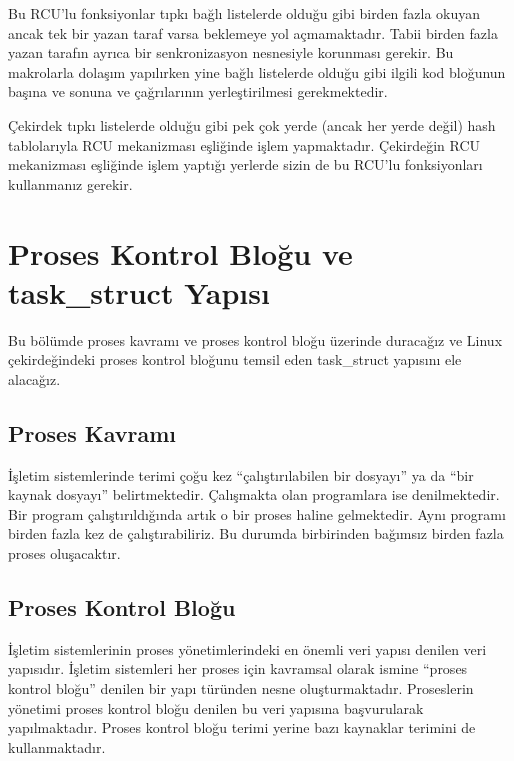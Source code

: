 \documentclass[a4paper,10pt,turkish]{sphinxmanual}
\begin{document}
\sphinxAtStartPar
Bu RCU’lu fonksiyonlar tıpkı bağlı listelerde olduğu gibi birden fazla okuyan ancak tek bir
yazan taraf varsa beklemeye yol açmamaktadır. Tabii birden fazla yazan tarafın ayrıca bir
senkronizasyon nesnesiyle korunması gerekir. Bu makrolarla dolaşım yapılırken yine bağlı
listelerde olduğu gibi ilgili kod bloğunun başına ve sonuna  ve
 çağrılarının yerleştirilmesi gerekmektedir.

\sphinxAtStartPar
Çekirdek tıpkı listelerde olduğu gibi pek çok yerde (ancak her yerde değil) hash tablolarıyla
RCU mekanizması eşliğinde işlem yapmaktadır. Çekirdeğin RCU mekanizması eşliğinde işlem
yaptığı yerlerde sizin de bu RCU’lu fonksiyonları kullanmanız gerekir.

\sphinxstepscope


\chapter{Proses Kontrol Bloğu ve task\_struct Yapısı}
\label{\detokenize{processcontrolblock:proses-kontrol-blogu-ve-task-struct-yapisi}}\label{\detokenize{processcontrolblock::doc}}
\sphinxAtStartPar
Bu bölümde proses kavramı ve proses kontrol bloğu üzerinde duracağız ve Linux çekirdeğindeki proses
kontrol bloğunu temsil eden task\_struct yapısını ele alacağız.


\section{Proses Kavramı}
\label{\detokenize{processcontrolblock:proses-kavrami}}
\sphinxAtStartPar
İşletim sistemlerinde  terimi çoğu kez “çalıştırılabilen bir dosyayı” ya da “bir kaynak dosyayı”
belirtmektedir. Çalışmakta olan programlara ise  denilmektedir. Bir program çalıştırıldığında artık
o bir proses haline gelmektedir. Aynı programı birden fazla kez de çalıştırabiliriz. Bu durumda birbirinden
bağımsız birden fazla proses oluşacaktır.


\section{Proses Kontrol Bloğu}
\label{\detokenize{processcontrolblock:proses-kontrol-blogu}}
\sphinxAtStartPar
İşletim sistemlerinin proses yönetimlerindeki en önemli veri yapısı  denilen veri yapısıdır. İşletim sistemleri her proses için kavramsal olarak ismine “proses kontrol
bloğu” denilen bir yapı türünden nesne oluşturmaktadır. Proseslerin yönetimi proses kontrol bloğu denilen
bu veri yapısına başvurularak yapılmaktadır. Proses kontrol bloğu terimi yerine bazı kaynaklar  terimini de kullanmaktadır.
\end{document}
